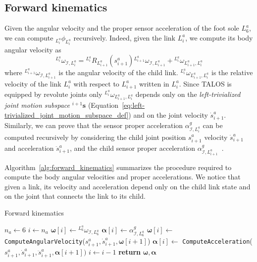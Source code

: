 \subsection{Forward kinematics\label{sec:forward_kinematics_flex_joints}}
Given the angular velocity and the proper sensor acceleration of the foot sole $L^a_6$, we can compute ${}_{{L^{a}_i}}  \phi_{{L^{a}_i}}$ recursively. Indeed, given the link ${L^{a}_i}$, we compute its body angular velocity as
\begin{equation}
\label{eq:angular_velocity_algorithm}
{}^{{L^{a}_i}} \omega _{\mathcal{I}, {L^{a}_i}} = {}^{{L^{a}_i}} R_{L^{a}_{i+1}}(s^a_{i+1}) {}^{L^{a}_{i+1}} \omega _{\mathcal{I}, L^{a}_{i+1}} +   {}^{L^{a}_{i}} \omega _{L^{a}_{i+1},  L^{a}_{i}}
\end{equation}
where ${}^{L^{a}_{i+1}} \omega _{\mathcal{I}, L^{a}_{i+1}}$ is the angular velocity of the child link.  ${}^{L^{a}_{i}} \omega _{L^{a}_{i+1},  L^{a}_{i}}$ is the relative velocity of the link $L^{a}_{i}$ with respect to $L^{a}_{i+1}$ written in ${L^{a}_{i}}$. Since TALOS is equipped by revolute joints only ${}^{L^{a}_{i}} \omega _{L^{a}_{i+1},  L^{a}_{i}}$ depends only on the \emph{left-trivialized joint motion subspace} ${}^{i+1}\textbf{s}$ (Equation~\eqref{eq:left-trivialized_joint_motion_subspace_def}) and on the joint velocity $\dot{s}^a_{i+1}$. 
Similarly, we can prove that the sensor proper acceleration $\alpha ^ g _ {\mathcal{I},L^{a}_{i}}$  can be computed recursively by considering the child joint position ${s}^a_{i+1}$ velocity $\dot{s}^a_{i+1}$ and acceleration $\ddot{s}^a_{i+1}$, and the child sensor proper acceleration $\alpha ^ g _ {\mathcal{I},L^{a}_{i+1}}$~\citep[Section~4.4.3]{Traversaro2017ModellingDynamics}.
\par
Algorithm~\ref{alg:forward_kinematics} summarizes the procedure required to compute the body angular velocities and proper accelerations. We notice that given a link, its velocity and acceleration depend only on the child link state and on the joint that connects the link to its child. 
\begin{algorithm}[t]
\caption{Forward kinematics}\label{alg:forward_kinematics}
\begin{algorithmic}
\State $n_a \gets 6$ 
\State $i \gets n_a$
    \State $\bm{\omega} [i] \gets {}^{{L^{a}_6}} \omega _{\mathcal{I}, {L^{a}_6}}$
    \State $\bm{\alpha} [i] \gets \alpha^g_{\mathcal{I}, {L^{a}_6}}$
\Else
    \State $\bm{\omega} [i] \gets$ \texttt{ComputeAngularVelocity}($s^a_{i+1},\dot{s}^a_{i+1}, \bm{\omega}[i+1]$) 
    \State $\bm{\alpha} [i] \gets $ \texttt{ComputeAcceleration}($s^a_{i+1},\dot{s}^a_{i+1}, \ddot{s}^a_{i+1}, \bm{\alpha}[i+1])$
\EndIf
\State $i \gets i - 1$
\EndWhile
\State \textbf{return} $\bm{\omega}, \bm{\alpha}$
\EndProcedure
\end{algorithmic}
\end{algorithm}
